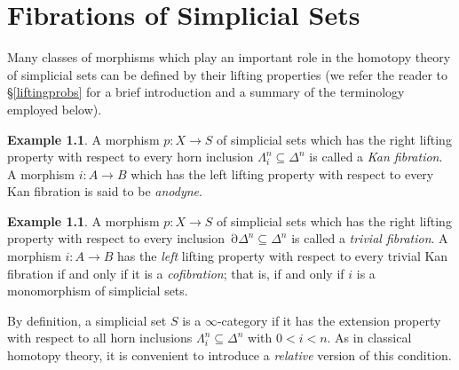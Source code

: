 \documentclass[12pt, final]{report}
\DeclareMathOperator{\bd}{\partial}
\theoremstyle{definition}
\newtheorem{example}[theorem]{Example}
\begin{document}


\chapter{Fibrations of Simplicial Sets}\label{chap2}

\setcounter{theorem}{0}
\setcounter{subsection}{0}


%

 Many classes of morphisms which play an important role in the homotopy theory of simplicial sets can be defined by their lifting properties (we refer the reader to \S \ref{liftingprobs} for a brief introduction and a summary of the terminology employed below). 

\begin{example} 
A morphism $p: X \rightarrow S$ of simplicial sets which has the right
lifting property with respect to every horn inclusion $\Lambda^n_i \subseteq \Delta^n$ is called a {\it Kan fibration}. A morphism $i: A \rightarrow B$ which has the left lifting property with respect to every Kan fibration is said to be {\it anodyne}.
\end{example}

\begin{example}
A morphism $p: X \rightarrow S$ of simplicial sets which has the right
lifting property with respect to every inclusion $\bd \Delta^n \subseteq \Delta^n$ is called a {\it trivial fibration}.
A morphism $i: A \rightarrow B$ has the {\em left} lifting property with respect to every trivial Kan fibration if and only if it is a {\it cofibration}; that is, if and only if $i$ is a monomorphism of simplicial sets.
\end{example}

By definition, a simplicial set $S$ is a $\infty$-category if it has
the extension property with respect to all horn inclusions
$\Lambda^n_i \subseteq \Delta^n$ with $0 < i < n$. As in classical homotopy theory, it is
convenient to introduce a {\em relative} version of this condition.
\end{document}
